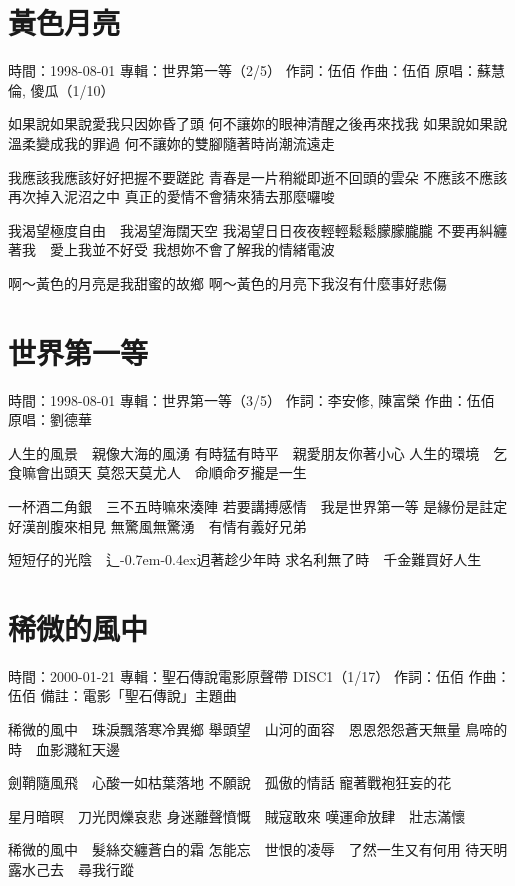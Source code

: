 \documentclass[UTF8,a4paper,oneside,twocolumn,12pt]{ctexbook}
\newcommand{\infopair}[2]{\textbullet #1：#2}
\newcommand{\zc}[1][伍佰]{\infopair{作詞}{#1}}
\newcommand{\zq}[1][伍佰]{\infopair{作曲}{#1}}
\newcommand{\zj}[1]{\infopair{專輯}{#1}}
\newcommand{\yc}[1]{\infopair{原唱}{#1}}
\newcommand{\sj}[1]{\infopair{時間}{#1}}
\newcommand{\bz}[1]{\infopair{備註}{#1}}
\newcommand{\tshittho}{\hbox{辶\kern-0.7em\lower-0.4ex\hbox{\scalebox{0.7}{日}}}迌}
\newenvironment{info}{\begin{flushleft}\kaishu
	}
	{\end{flushleft}\normalsize\yahei\par}
\newenvironment{lyric}{
	}
{}
\begin{document}
\section{黃色月亮}
\begin{info}
	\sj{1998-08-01}
	\zj{世界第一等（2/5）}
	\zc
	\zq
	\yc{蘇慧倫, 傻瓜（1/10）}
\end{info}
\begin{lyric}
	如果說如果說愛我只因妳昏了頭  何不讓妳的眼神清醒之後再來找我
	如果說如果說溫柔變成我的罪過  何不讓妳的雙腳隨著時尚潮流遠走

	我應該我應該好好把握不要蹉跎  青春是一片稍縱即逝不回頭的雲朵
	不應該不應該再次掉入泥沼之中  真正的愛情不會猜來猜去那麼囉唆

	我渴望極度自由　我渴望海闊天空  我渴望日日夜夜輕輕鬆鬆朦朦朧朧
	不要再糾纏著我　愛上我並不好受  我想妳不會了解我的情緒電波

	啊～黃色的月亮是我甜蜜的故鄉  啊～黃色的月亮下我沒有什麼事好悲傷
\end{lyric}

\section{世界第一等}
\begin{info}
	\sj{1998-08-01}
	\zj{世界第一等（3/5）}
	\zc[李安修, 陳富榮]
	\zq
	\yc{劉德華}
\end{info}
\begin{lyric}
	人生的風景　親像大海的風湧
	有時猛有時平　親愛朋友你著小心
	人生的環境　乞食嘛會出頭天
	莫怨天莫尤人　命順命歹攏是一生

	一杯酒二角銀　三不五時嘛來湊陣
	若要講搏感情　我是世界第一等
	是緣份是註定　好漢剖腹來相見
	無驚風無驚湧　有情有義好兄弟

	短短仔的光陰　\tshittho{}著趁少年時
	求名利無了時　千金難買好人生
\end{lyric}

\section{稀微的風中}
\begin{info}
	\sj{2000-01-21}
	\zj{聖石傳說電影原聲帶 DISC1（1/17）}
	\zc
	\zq
	\bz{電影「聖石傳說」主題曲}
\end{info}
\begin{lyric}
	稀微的風中　珠淚飄落寒冷異鄉
	舉頭望　山河的面容　恩恩怨怨蒼天無量
	鳥啼的時　血影濺紅天邊

	劍鞘隨風飛　心酸一如枯葉落地
	不願說　孤傲的情話
	寵著戰袍狂妄的花

	星月暗暝　刀光閃爍哀悲
	身迷離聲憤慨　賊寇敢來
	嘆運命放肆　壯志滿懷

	稀微的風中　髮絲交纏蒼白的霜
	怎能忘　世恨的凌辱　了然一生又有何用
	待天明露水己去　尋我行蹤
\end{lyric}
\end{document}
